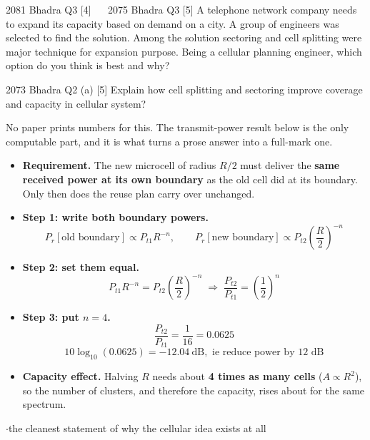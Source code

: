 \begin{asked}{2081 Bhadra \textperiodcentered{} Q3 \textperiodcentered{} [4]
\ \textperiodcentered{} \ 2075 Bhadra \textperiodcentered{} Q3 \textperiodcentered{} [5]}
A telephone network company needs to expand its capacity based on demand on a city. A group of
engineers was selected to find the solution. Among the solution sectoring and cell splitting
were major technique for expansion purpose. Being a cellular planning engineer, which option do
you think is best and why?
\end{asked}
\begin{asked}{2073 Bhadra \textperiodcentered{} Q2 (a) \textperiodcentered{} [5]}
Explain how cell splitting and sectoring improve coverage and capacity in cellular system?
\end{asked}
{\color{sub}\footnotesize No paper prints numbers for this. The transmit-power result below is
the only computable part, and it is what turns a prose answer into a full-mark one. \added}

\begin{itemize}
  \item \textbf{Requirement.} The new microcell of radius $R/2$ must deliver the \textbf{same
        received power at its own boundary} as the old cell did at its boundary. Only then does
        the reuse plan carry over unchanged.
  \item \textbf{Step 1: write both boundary powers.}
        \[ P_r[\text{old boundary}] \propto P_{t1} R^{-n}, \qquad
           P_r[\text{new boundary}] \propto P_{t2} \left(\frac{R}{2}\right)^{-n} \]
  \item \textbf{Step 2: set them equal.}
        \[ P_{t1} R^{-n} = P_{t2} \left(\frac{R}{2}\right)^{-n}
           \;\Longrightarrow\; \frac{P_{t2}}{P_{t1}} = \left(\frac{1}{2}\right)^{n} \]
  \item \textbf{Step 3: put $n = 4$.}
        \[ \frac{P_{t2}}{P_{t1}} = \frac{1}{16} = 0.0625 \]
        \[ 10\log_{10}(0.0625) = \boxed{-12.04\ \text{dB}, \text{ ie reduce power by 12 dB}} \]
  \item \textbf{Capacity effect.} Halving $R$ needs about \textbf{4 times as many cells}
        ($A \propto R^2$), so the number of clusters, and therefore the capacity, rises about
         for the same spectrum.
\end{itemize}

\hr

{\color{sub}\footnotesize {} 
\gap$\cdot$\gap the cleanest statement of why the cellular idea exists at all}


